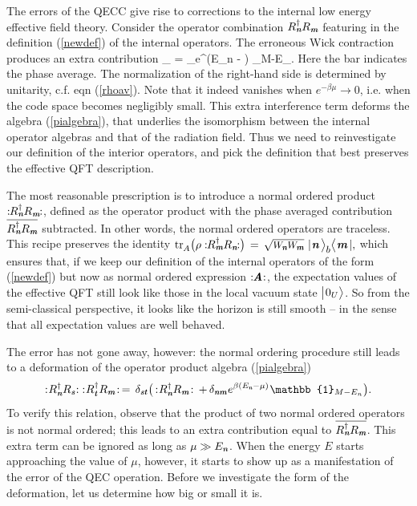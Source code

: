 \documentclass[12pt]{article}%
\def\spc{\hspace{.5pt}}
\def\be{\begin{equation}}
\def\ee{\end{equation}}
\begin{document}
 




The errors of the QECC give rise to  corrections to the internal low energy effective field theory. Consider the operator combination $R^\dag_{ \textit{\textbf n}} R_{ \textit{\textbf m}}$ featuring in the definition (\ref{newdef}) of the internal  operators. The erroneous Wick contraction produces an extra contribution
\bea
\label{errorcont}
  \is  {} {\sqrt{\pp_\nomt\pp_\momt}} \sum_{\ibar} \overline{\cC_\nom\spc  \bigl|\ibar\ra \la\ibar \bigl|  \cC^{\, \dag}_\mom} = \delta_\nm \spc e^{\beta(E_n - \mu)}  _{M-E_\nom}.
\eea
Here the bar indicates the phase average. The normalization of the right-hand side is determined by unitarity, c.f.  eqn (\ref{rhoav}).
Note that it indeed vanishes when $e^{-\beta\mu}\to 0$, i.e. when the code space becomes negligibly small.
This extra interference term deforms the algebra (\ref{pialgebra}), that underlies the isomorphism between the internal operator
algebras and that of the radiation field.  Thus we need to reinvestigate our definition of the interior operators, and pick the 
definition that best preserves the effective QFT description.

The most reasonable prescription is to introduce a normal ordered product $:\!\!R^\dag_{ \textit{\textbf n}} R_{ \textit{\textbf m}}\!\!: $, defined as the operator product with the 
phase averaged contribution $\overline{R^\dag_{ \textit{\textbf n}} R_{ \textit{\textbf m}}}$ subtracted. In other words, the normal ordered operators are traceless.
This recipe preserves the identity $
 \tr_\AA \bigl(\rho :\!\!R^\dag_\mom R_\nom \!\!:\bigr) \, =\,  \sqrt{\pp_\nom \pp_\mom }\, \, |\spc \nom \, \ra_\bbbb \la\spc \mom \, | ,$
which ensures that, if we keep our definition of the internal operators of the form (\ref{newdef}) but now as normal ordered expression $:\!\!\aA \!\nspc :$, 
 the expectation values of the effective QFT still look like those in the local vacuum state $\bigl|\spc 0_U\ra$.
So from the  semi-classical perspective, it looks like the horizon is still smooth -- in the sense that all expectation values are well behaved.


The error has not gone away, however: the normal ordering procedure still leads to a deformation of the operator product
algebra (\ref{pialgebra})  
\be
\label{deform}
:\!\nspc R^\dag_\nom R_{\som}\nspc \!:\;:\!\nspc R^\dag_\tom R_\mom\!: \, = \, \delta_{\som\tom} \spc \bigl(\, :\! \nspc R^\dag_\nom R_\mom \!:\, +  \, \delta_{\nom\mom} \spc e^{\beta ( E_\nom - \mu)}\spc \mathbb{1}_{M-E_n}\bigr).
\ee
To verify this relation, observe that the product of two normal ordered operators is not normal ordered; this leads to an extra contribution equal to $\overline{R^\dag_{ \textit{\textbf n}} R_{ \textit{\textbf m}}}$.
This extra term can be ignored as long as $\mu \gg E_{ \textit{\textbf n}}$. When the energy $E$ starts approaching the value of $\mu$, however, it starts to show up as a manifestation of the error of the QEC operation. Before we investigate the form of the deformation, let us determine how big or small it is.
\end{document}
